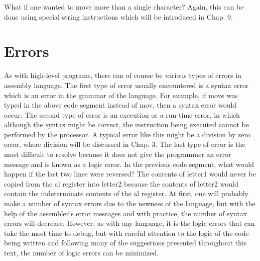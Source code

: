 \documentclass[10pt]{book}
\begin{document}
What if one wanted to move more than a single character? Again, this can be done using special string instructions which will be introduced in Chap. 9.

\section{Errors}
As with high-level programs, there can of course be various types of errors in assembly language. The first type of error usually encountered is a syntax error which is an error in the grammar of the language. For example, if move was typed in the above code segment instead of mov, then a syntax error would occur. The second type of error is an execution or a run-time error, in which although the syntax might be correct, the instruction being executed cannot be performed by the processor. A typical error like this might be a division by zero error, where division will be discussed in Chap. 3. The last type of error is the most difficult to resolve because it does not give the programmer an error message and is known as a logic error. In the previous code segment, what would happen if the last two lines were reversed? The contents of letter1 would never be copied from the al register into letter2 because the contents of letter2 would contain the indeterminate contents of the al register. At first, one will probably make a number of syntax errors due to the newness of the language, but with the help of the assembler's error messages and with practice, the number of syntax errors will decrease. However, as with any language, it is the logic errors that can take the most time to debug, but with careful attention to the logic of the code being written and following many of the suggestions presented throughout this text, the number of logic errors can be minimized.
\end{document}
